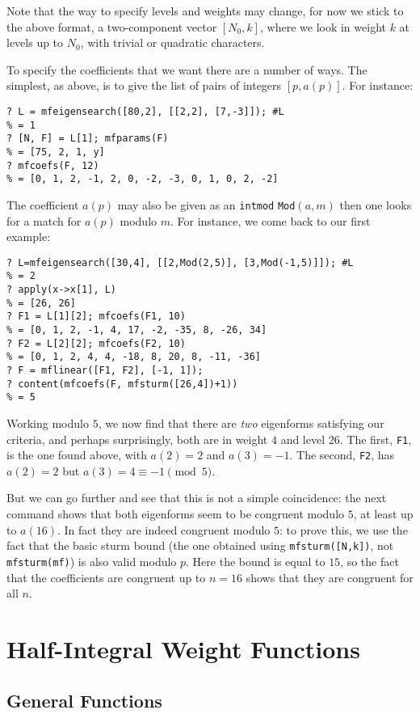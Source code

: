 \documentclass[11pt]{article}
\def\kbd#1{{\tt #1}}
\begin{document}
Note that the way to specify levels and weights may change, for now we
stick to the above format, a two-component vector $[N_0,k]$,
where we look in weight $k$ at levels up to $N_0$, with trivial
or quadratic characters.

To specify the coefficients that we want there are a number of ways. The
simplest, as above, is to give the list of pairs of integers $[p,a(p)]$.
For instance:

\begin{verbatim}
? L = mfeigensearch([80,2], [[2,2], [7,-3]]); #L
% = 1
? [N, F] = L[1]; mfparams(F)
% = [75, 2, 1, y]
? mfcoefs(F, 12)
% = [0, 1, 2, -1, 2, 0, -2, -3, 0, 1, 0, 2, -2]
\end{verbatim}

The coefficient $a(p)$ may also be given as an \kbd{intmod} \kbd{Mod}$(a,m)$
then one looks for a match for $a(p)$ modulo $m$. For instance, we come
back to our first example:
\begin{verbatim}
? L=mfeigensearch([30,4], [[2,Mod(2,5)], [3,Mod(-1,5)]]); #L
% = 2
? apply(x->x[1], L)
% = [26, 26]
? F1 = L[1][2]; mfcoefs(F1, 10)
% = [0, 1, 2, -1, 4, 17, -2, -35, 8, -26, 34]
? F2 = L[2][2]; mfcoefs(F2, 10)
% = [0, 1, 2, 4, 4, -18, 8, 20, 8, -11, -36]
? F = mflinear([F1, F2], [-1, 1]);
? content(mfcoefs(F, mfsturm([26,4])+1))
% = 5
\end{verbatim}

Working modulo $5$, we now find that there are \emph{two} eigenforms
satisfying our criteria, and perhaps surprisingly, both are in weight $4$
and level $26$. The first, \kbd{F1}, is the one found above, with
$a(2)=2$ and $a(3)=-1$. The second, \kbd{F2}, has $a(2)=2$ but
$a(3)=4\equiv-1\pmod5$.

But we can go further and see that this is not a simple coincidence:
the next command shows that both eigenforms seem to be congruent modulo $5$,
at least up to $a(16)$. In fact they are indeed congruent modulo $5$:
to prove this, we use the fact that the basic sturm bound (the one obtained
using \kbd{mfsturm([N,k])}, not \kbd{mfsturm(mf)}) is also valid modulo
$p$. Here the bound is equal to $15$, so the fact that the coefficients
are congruent up to $n=16$ shows that they are congruent for all $n$.

\section{Half-Integral Weight Functions}

\subsection{General Functions}
\end{document}
